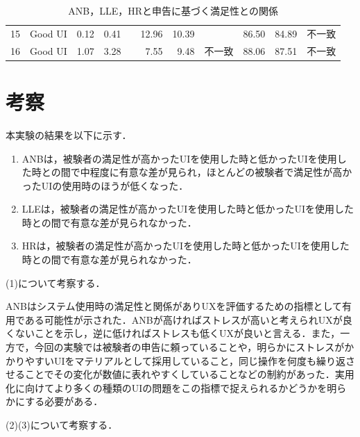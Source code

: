 \begin{landscape}
\begin{table}[htbp]
\begin{tabular}{llrrlrrlrrl}
15                      & Good UI                & 0.12                     & 0.41                     &                        & 12.96                    & 10.39                    &                        & 86.50                    & 84.89                    & 不一致                    \\
16                      & Good UI                & 1.07                     & 3.28                     &                        & 7.55                     & 9.48                     & 不一致                    & 88.06                    & 87.51                    & 不一致                    \\ \hline
\end{tabular}
\label{table:result1-2}
\caption{ANB，LLE，HRと申告に基づく満足性との関係}
\end{table}
\end{landscape}

\section{考察}

本実験の結果を以下に示す．

\begin{enumerate}
\renewcommand{\labelenumi}{(\arabic{enumi})}
  \item ANBは，被験者の満足性が高かったUIを使用した時と低かったUIを使用した時との間で中程度\cite{cohen}に有意な差が見られ，ほとんどの被験者で満足性が高かったUIの使用時のほうが低くなった．
  \item LLEは，被験者の満足性が高かったUIを使用した時と低かったUIを使用した時との間で有意な差が見られなかった．
  \item HRは，被験者の満足性が高かったUIを使用した時と低かったUIを使用した時との間で有意な差が見られなかった．
\end{enumerate}

(1)について考察する．

ANBはシステム使用時の満足性と関係がありUXを評価するための指標として有用である可能性が示された．ANBが高ければストレスが高いと考えられUXが良くないことを示し，逆に低ければストレスも低くUXが良いと言える．また，一方で，今回の実験では被験者の申告に頼っていることや，明らかにストレスがかかりやすいUIをマテリアルとして採用していること，同じ操作を何度も繰り返させることでその変化が数値に表れやすくしていることなどの制約があった．実用化に向けてより多くの種類のUIの問題をこの指標で捉えられるかどうかを明らかにする必要がある．

(2)(3)について考察する．

